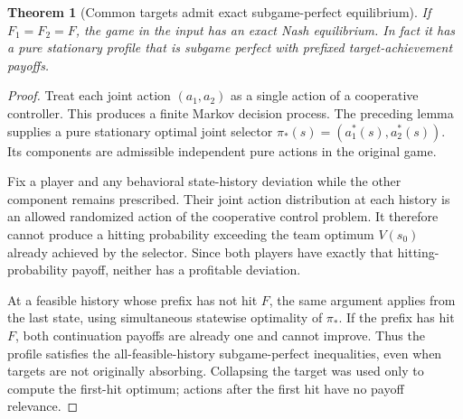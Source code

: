 \documentclass[11pt,a4paper]{article}
\newtheorem{theorem}{Theorem}[section]
\theoremstyle{definition}
\theoremstyle{remark}
\begin{document}
\begin{theorem}[Common targets admit exact subgame-perfect equilibrium]
If $F_1=F_2=F$, the game in the input has an exact Nash equilibrium. In fact it has a pure stationary profile that is subgame perfect with prefixed target-achievement payoffs.
\end{theorem}
\begin{proof}
Treat each joint action $(a_1,a_2)$ as a single action of a cooperative controller. This produces a finite Markov decision process. The preceding lemma supplies a pure stationary optimal joint selector $\pi_*(s)=(a_1^*(s),a_2^*(s))$. Its components are admissible independent pure actions in the original game.

Fix a player and any behavioral state-history deviation while the other component remains prescribed. Their joint action distribution at each history is an allowed randomized action of the cooperative control problem. It therefore cannot produce a hitting probability exceeding the team optimum $V(s_0)$ already achieved by the selector. Since both players have exactly that hitting-probability payoff, neither has a profitable deviation.

At a feasible history whose prefix has not hit $F$, the same argument applies from the last state, using simultaneous statewise optimality of $\pi_*$. If the prefix has hit $F$, both continuation payoffs are already one and cannot improve. Thus the profile satisfies the all-feasible-history subgame-perfect inequalities, even when targets are not originally absorbing. Collapsing the target was used only to compute the first-hit optimum; actions after the first hit have no payoff relevance.
\end{proof}
\end{document}

